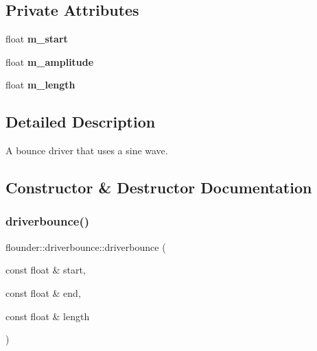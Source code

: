 \subsection*{Private Attributes}
\begin{DoxyCompactItemize}
\item 
\mbox{\label{classflounder_1_1driverbounce_a3227c13c05f51b7e16297a16ceaba2ce}} 
float {\bfseries m\+\_\+start}
\item 
\mbox{\label{classflounder_1_1driverbounce_ad1158cd9f43b9af60f40f8a974f5e369}} 
float {\bfseries m\+\_\+amplitude}
\item 
\mbox{\label{classflounder_1_1driverbounce_abd011916f956cd1364a1ef3c275dd733}} 
float {\bfseries m\+\_\+length}
\end{DoxyCompactItemize}


\subsection{Detailed Description}
A bounce driver that uses a sine wave. 



\subsection{Constructor \& Destructor Documentation}
\mbox{\label{classflounder_1_1driverbounce_a92651c598bb5e6b7d8d8f686fc07bcd1}} 
\subsubsection{\texorpdfstring{driverbounce()}{driverbounce()}}
{\footnotesize\ttfamily flounder\+::driverbounce\+::driverbounce (\begin{DoxyParamCaption}\item[{const float \&}]{start,  }\item[{const float \&}]{end,  }\item[{const float \&}]{length }\end{DoxyParamCaption})}



